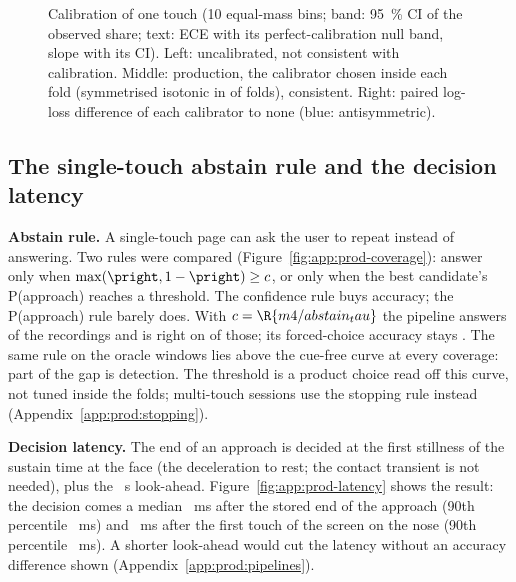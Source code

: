 \begin{figure}[htbp]
  \centering
  \caption{Calibration of one touch (10 equal-mass bins; band: 95~\% CI of the observed share; text: ECE with its perfect-calibration null band, slope with its CI). Left: uncalibrated, not consistent with calibration. Middle: production, the calibrator chosen inside each fold (symmetrised isotonic in  of  folds), consistent. Right: paired log-loss difference of each calibrator to none (blue: antisymmetric).}
  \label{fig:M4_05_calibration}\label{fig:app:prod-cal}
\end{figure}
\FloatBarrier

\subsection{The single-touch abstain rule and the decision latency}\label{app:prod:abstain}

\textbf{Abstain rule.}
A single-touch page can ask the user to repeat instead of answering.
Two rules were compared (Figure~\ref{fig:app:prod-coverage}): answer only when $\max(\pright, 1-\pright) \ge c$, or only when the best candidate's P(approach) reaches a threshold.
The confidence rule buys accuracy; the P(approach) rule barely does.
With $c = \R{m4/abstain_tau}$ the pipeline answers  of the recordings and is right on  of those; its forced-choice accuracy stays .
The same rule on the oracle windows lies above the cue-free curve at every coverage: part of the gap is detection.
The threshold is a product choice read off this curve, not tuned inside the folds; multi-touch sessions use the stopping rule instead (Appendix~\ref{app:prod:stopping}).

\textbf{Decision latency.}
The end of an approach is decided at the first stillness of the sustain time at the face (the deceleration to rest; the contact transient is not needed), plus the ~s look-ahead.
Figure~\ref{fig:app:prod-latency} shows the result: the decision comes a median ~ms after the stored end of the approach (90th percentile ~ms) and ~ms after the first touch of the screen on the nose (90th percentile ~ms).
A shorter look-ahead would cut the latency without an accuracy difference shown (Appendix~\ref{app:prod:pipelines}).

